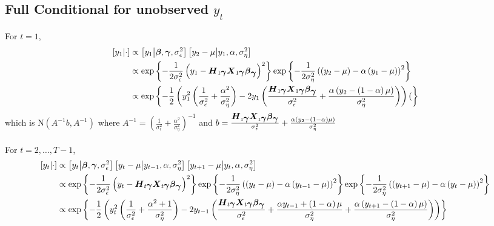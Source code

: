 \documentclass[fleqn]{article}
\def\bm#1{\mbox{\boldmath $#1$}}
\begin{document}
\subsection{Full Conditional for unobserved $y_t$}
%
For $t = 1$, 
%
\begin{align*}
%
\left[ y_1 \middle| \cdot \right] & \propto \left[ y_1 \middle| \bm{\beta}, \bm{\gamma}, \sigma^2_\epsilon \right] \left[ y_2 - \mu \middle| y_1, \alpha, \sigma^2_\eta \right] \\
%
& \propto \exp{ \left\{ - \frac{1} {2 \sigma^2_\epsilon} \left( y_1 - \bm{H}_{1 \bm{\gamma}} \bm{X}_{1 \bm{\gamma}} \bm{\beta}_{\bm{\gamma}} \right)^2 \right\} } \exp{ \left\{ - \frac{1} {2 \sigma^2_\eta} \left( \left( y_2 - \mu \right) - \alpha \left( y_1 - \mu \right) \right)^2 \right\} } \\
%
& \propto \exp{ \left\{ - \frac{1} {2} \left( y_1^2 \left( \frac{1} {\sigma^2_\epsilon} + \frac{\alpha^2} {\sigma^2_\eta} \right) - 2 y_1 \left( \frac{\bm{H}_{1 \bm{\gamma}} \bm{X}_{1 \bm{\gamma}} \bm{\beta}_{\bm{\gamma}}} {\sigma^2_\epsilon} + \frac{\alpha \left( y_2 - \left( 1 - \alpha \right) \mu  \right) } {\sigma^2_\eta} \right) \right)( \right\} } \\
%
\end{align*}
%
which is $\mbox{N}\left( A^{ - 1} b, A^{ - 1} \right)$ where $A^{ - 1} = \left( \frac{1} {\sigma^2_\epsilon} + \frac{\alpha^2} {\sigma^2_\eta} \right)^{ - 1}$ and $b = \frac{\bm{H}_{1 \bm{\gamma}} \bm{X}_{1 \bm{\gamma}} \bm{\beta}_{\bm{\gamma}}} {\sigma^2_\epsilon} + \frac{\alpha \left( y_2 - \left( 1 - \alpha \right) \mu  \right) } {\sigma^2_\eta}$\\
\\
For $t = 2, \ldots, T - 1$, 
%
\begin{align*}
%
\left[ y_t \middle| \cdot \right] & \propto \left[ y_t \middle| \bm{\beta}, \bm{\gamma}, \sigma^2_\epsilon \right] \left[ y_t - \mu \middle| y_{t - 1}, \alpha, \sigma^2_\eta \right] \left[ y_{t + 1} - \mu \middle| y_t, \alpha, \sigma^2_\eta \right] \\
%
& \propto \exp{ \left\{ - \frac{1} {2 \sigma^2_\epsilon} \left( y_t - \bm{H}_{t \bm{\gamma}} \bm{X}_{t \bm{\gamma}} \bm{\beta}_{\bm{\gamma}} \right)^2 \right\} } \exp{ \left\{ - \frac{1} {2 \sigma^2_\eta} \left( \left( y_t - \mu \right) - \alpha \left( y_{t - 1} - \mu \right) \right)^2 \right\} } \exp{ \left\{ - \frac{1} {2 \sigma^2_\eta} \left( \left( y_{t + 1} - \mu \right) - \alpha \left( y_t - \mu \right) \right)^2 \right\} } \\
%
& \propto \exp{ \left\{ - \frac{1} {2} \left( y_t^2 \left( \frac{1} {\sigma^2_\epsilon} + \frac{\alpha^2 + 1} {\sigma^2_\eta} \right) - 2 y_{t - 1} \left( \frac{\bm{H}_{t \bm{\gamma}} \bm{X}_{t \bm{\gamma}} \bm{\beta}_{\bm{\gamma}}} {\sigma^2_\epsilon} + \frac{\alpha y_{t - 1} + \left( 1 - \alpha \right) \mu } {\sigma^2_\eta} + \frac{\alpha \left( y_{t + 1} - \left( 1 - \alpha \right) \mu  \right) } {\sigma^2_\eta} \right) \right) \right\} } \\
%
\end{align*}
\end{document}
